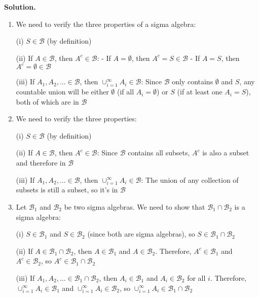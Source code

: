 \noindent\textbf{Solution.}
\begin{enumerate}[label=(\alph*)]
    \item We need to verify the three properties of a sigma algebra:
    
    (i) $S \in \mathcal{B}$ (by definition)
    
    (ii) If $A \in \mathcal{B}$, then $A^c \in \mathcal{B}$:
    - If $A = \emptyset$, then $A^c = S \in \mathcal{B}$
    - If $A = S$, then $A^c = \emptyset \in \mathcal{B}$
    
    (iii) If $A_1, A_2, \ldots \in \mathcal{B}$, then $\cup_{i=1}^{\infty} A_i \in \mathcal{B}$:
    Since $\mathcal{B}$ only contains $\emptyset$ and $S$, any countable union will be either $\emptyset$ (if all $A_i = \emptyset$) or $S$ (if at least one $A_i = S$), both of which are in $\mathcal{B}$
    
    \item We need to verify the three properties:
    
    (i) $S \in \mathcal{B}$ (by definition)
    
    (ii) If $A \in \mathcal{B}$, then $A^c \in \mathcal{B}$:
    Since $\mathcal{B}$ contains all subsets, $A^c$ is also a subset and therefore in $\mathcal{B}$
    
    (iii) If $A_1, A_2, \ldots \in \mathcal{B}$, then $\cup_{i=1}^{\infty} A_i \in \mathcal{B}$:
    The union of any collection of subsets is still a subset, so it's in $\mathcal{B}$
    
    \item Let $\mathcal{B}_1$ and $\mathcal{B}_2$ be two sigma algebras. We need to show that $\mathcal{B}_1 \cap \mathcal{B}_2$ is a sigma algebra:
    
    (i) $S \in \mathcal{B}_1$ and $S \in \mathcal{B}_2$ (since both are sigma algebras), so $S \in \mathcal{B}_1 \cap \mathcal{B}_2$
    
    (ii) If $A \in \mathcal{B}_1 \cap \mathcal{B}_2$, then $A \in \mathcal{B}_1$ and $A \in \mathcal{B}_2$. Therefore, $A^c \in \mathcal{B}_1$ and $A^c \in \mathcal{B}_2$, so $A^c \in \mathcal{B}_1 \cap \mathcal{B}_2$
    
    (iii) If $A_1, A_2, \ldots \in \mathcal{B}_1 \cap \mathcal{B}_2$, then $A_i \in \mathcal{B}_1$ and $A_i \in \mathcal{B}_2$ for all $i$. Therefore, $\cup_{i=1}^{\infty} A_i \in \mathcal{B}_1$ and $\cup_{i=1}^{\infty} A_i \in \mathcal{B}_2$, so $\cup_{i=1}^{\infty} A_i \in \mathcal{B}_1 \cap \mathcal{B}_2$
\end{enumerate}


